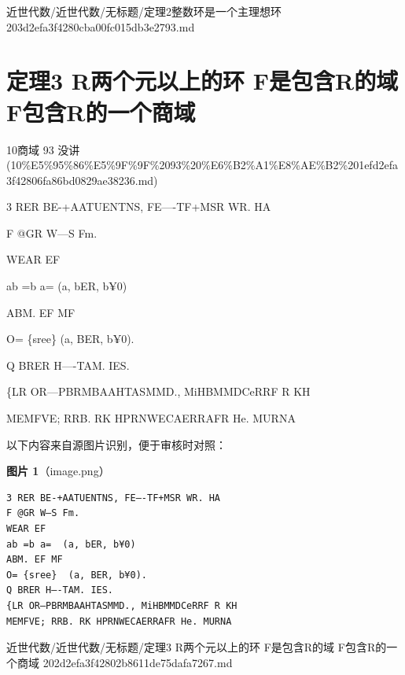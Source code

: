 \begin{note}[来源路径]

近世代数/近世代数/无标题/定理2整数环是一个主理想环 203d2efa3f4280cba00fc015db3e2793.md

\end{note}

\section*{定理3 R两个元以上的环 F是包含R的域 F包含R的一个商域}

\begin{note}[来源上级主题]

10商域 93 没讲 (10\%E5\%95\%86\%E5\%9F\%9F\%2093\%20\%E6\%B2\%A1\%E8\%AE\%B2\%201efd2efa3f42806fa86bd0829ae38236.md)

\end{note}

\begin{theorem}

3 RER BE-+AATUENTNS, FE—-TF+MSR WR. HA

F @GR W—S Fm.

WEAR EF

ab =b a=  (a, bER, b¥0)

ABM. EF MF

O= \{sree\}  (a, BER, b¥0).

Q BRER H—-TAM. IES.

\{LR OR—PBRMBAAHTASMMD., MiHBMMDCeRRF R KH

MEMFVE; RRB. RK HPRNWECAERRAFR He. MURNA

\end{theorem}

\begin{note}
以下内容来自源图片识别，便于审核时对照：

\textbf{图片 1}（image.png）
\begin{Verbatim}[fontsize=\small]
3 RER BE-+AATUENTNS, FE—-TF+MSR WR. HA
F @GR W—S Fm.
WEAR EF
ab =b a=  (a, bER, b¥0)
ABM. EF MF
O= {sree}  (a, BER, b¥0).
Q BRER H—-TAM. IES.
{LR OR—PBRMBAAHTASMMD., MiHBMMDCeRRF R KH
MEMFVE; RRB. RK HPRNWECAERRAFR He. MURNA
\end{Verbatim}

\end{note}

\begin{note}[来源路径]

近世代数/近世代数/无标题/定理3 R两个元以上的环 F是包含R的域 F包含R的一个商域 202d2efa3f42802b8611de75dafa7267.md

\end{note}

